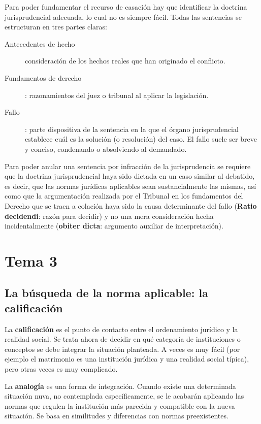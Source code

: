 \documentclass[a4paper,12pt]{report}
\begin{document}
Para poder fundamentar el recurso de casación hay que identificar la doctrina jurisprudencial adecuada, lo cual no es siempre fácil. Todas las sentencias se estructuran en tres partes claras:

\begin{description}
\item[Antecedentes de hecho] consideración de los hechos reales que han originado el conflicto.
\item[Fundamentos de derecho]: razonamientos del juez o tribunal al aplicar la legislación.
\item[Fallo]: parte dispositiva de la sentencia en la que el órgano jurisprudencial establece cuál es la solución (o resolución) del caso. El fallo suele ser breve y conciso, condenando o absolviendo al demandado.
\end{description}

Para poder anular una sentencia por infracción de la jurisprudencia se requiere que la doctrina jurisprudencial haya sido dictada en un caso similar al debatido, es decir, que las normas jurídicas aplicables sean sustancialmente las mismas, así como que la argumentación realizada por el Tribunal en los fundamentos del Derecho que se traen a colación haya sido la causa determinante del fallo (\textbf{Ratio decidendi}: razón para decidir) y no una mera consideración hecha incidentalmente (\textbf{obiter dicta}: argumento auxiliar de interpretación).

\chapter{Tema 3}
\section{La búsqueda de la norma aplicable: la calificación}

La \textbf{calificación} es el punto de contacto entre el ordenamiento jurídico y la realidad social. Se trata ahora de decidir en qué categoría de instituciones o conceptos se debe integrar la situación planteada. A veces es muy fácil (por ejemplo el matrimonio es una institución jurídica y una realidad social típica), pero otras veces es muy complicado.

La \textbf{analogía} es una forma de integración. Cuando existe una determinada situación nuva, no contemplada específicamente, se le acabarán aplicando las normas que regulen la institución más parecida y compatible con la nueva situación. Se basa en similitudes y diferencias con normas preexistentes.
\end{document}
